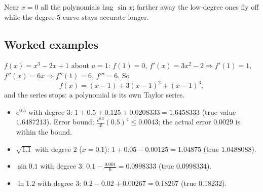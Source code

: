 \documentclass[11pt,a4paper]{article}
\begin{document}
\begin{center}
\end{center}
Near $x=0$ all the polynomials hug $\sin x$; farther away the low-degree ones fly off while the degree-5 curve stays accurate longer.

\subsection{Worked examples}
\begin{example}
$f(x)=x^3-2x+1$ about $a=1$: $f(1)=0$, $f'(x)=3x^2-2\Rightarrow f'(1)=1$, $f''(x)=6x\Rightarrow f''(1)=6$, $f'''=6$. So
\[f(x)=(x-1)+3(x-1)^2+(x-1)^3,\]
and the series stops: a polynomial is its own Taylor series.
\end{example}

\begin{example}
\begin{itemize}[noitemsep]
\item $e^{0.5}$ with degree $3$: $1+0.5+0.125+0.0208333=1.6458333$ (true value $1.6487213$). Error bound: $\frac{e^{0.5}}{4!}(0.5)^4\le0.0043$; the actual error $0.0029$ is within the bound.
\item $\sqrt{1.1}$ with degree $2$ ($x=0.1$): $1+0.05-0.00125=1.04875$ (true $1.0488088$).
\item $\sin0.1$ with degree $3$: $0.1-\frac{0.001}{6}=0.0998333$ (true $0.0998334$).
\item $\ln1.2$ with degree $3$: $0.2-0.02+0.00267=0.18267$ (true $0.18232$).
\end{itemize}
\end{example}
\end{document}
